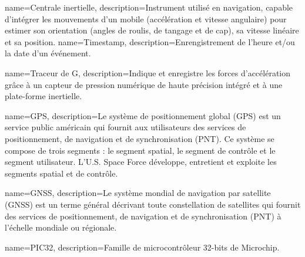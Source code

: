 
{
	name=Centrale inertielle,
	description={Instrument utilisé en navigation, capable d'intégrer les mouvements d'un mobile (accélération et vitesse angulaire) pour estimer son orientation (angles de roulis, de tangage et de cap), sa vitesse linéaire et sa position.}
}
{
	name=Timestamp,
	description={Enrengistrement de l'heure et/ou la date d'un événement.}
}

{
	name=Traceur de G,
	description={Indique et enregistre les forces d'accélération grâce à un capteur de pression numérique de haute précision intégré et à une plate-forme inertielle. }
}

{
	name=GPS,
	description={Le système de positionnement global (GPS) est un service public américain qui fournit aux utilisateurs des services de positionnement, de navigation et de synchronisation (PNT). Ce système se compose de trois segments : le segment spatial, le segment de contrôle et le segment utilisateur. L'U.S. Space Force développe, entretient et exploite les segments spatial et de contrôle.}
}

{
	name=GNSS,
	description={Le système mondial de navigation par satellite (GNSS) est un terme général décrivant toute constellation de satellites qui fournit des services de positionnement, de navigation et de synchronisation (PNT) à l'échelle mondiale ou régionale.}
}

{
	name=PIC32,
	description={Famille de microcontrôleur 32-bits de Microchip.}
}






